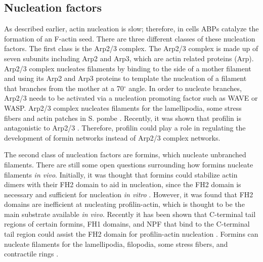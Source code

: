 \subsection{Nucleation factors}\label{nucleators}
As described earlier, actin nucleation is slow; therefore, in cells ABPs catalyze the formation of an F-actin seed. There are three different classes of these nucleation factors. The first class is the Arp2/3 complex. The Arp2/3 complex is made up of seven subunits including Arp2 and Arp3, which are actin related proteins (Arp). Arp2/3 complex nucleates filaments by binding to the side of a mother filament and using its Arp2 and Arp3 proteins to template the nucleation of a filament that branches from the mother at a 70$^{\circ}$ angle. In order to nucleate branches, Arp2/3 needs to be activated via a nucleation promoting factor such as WAVE or WASP. Arp2/3 complex nucleates filaments for the lamellipodia, some stress fibers and actin patches in S. pombe \citep{pollard_actin_2016, naumanen_mechanisms_2008, mishra_yeast_2014}. Recently, it was shown that profilin is antagonistic to Arp2/3 \citep{suarez_profilin_2015,rotty_profilin-1_2015}. Therefore, profilin could play a role in regulating the development of formin networks instead of Arp2/3 complex networks. 

The second class of nucleation factors are formins, which nucleate unbranched filaments. There are still some open questions surrounding how formins nucleate filaments \textit{in vivo}. Initially, it was thought that formins could stabilize actin dimers with their FH2 domain to aid in nucleation, since the FH2 domain is necessary and sufficient for nucleation \textit{in vitro} \citep{zigmond_formin-induced_2004,paul_role_2008,pring_mechanism_2002}. However, it was found that FH2 domains are inefficient at nucleating profilin-actin, which is thought to be the main substrate available \textit{in vivo}. Recently it has been shown that C-terminal tail regions of certain formins, FH1 domains, and NPF that bind to the C-terminal tail region could assist the FH2 domain for profilin-actin nucleation \citep{breitsprecher_formins_2013}. Formins can nucleate filaments for the lamellipodia, filopodia, some stress fibers, and contractile rings \citep{faix_filopodia:_2009,mishra_yeast_2014,blanchoin_actin_2014}.

